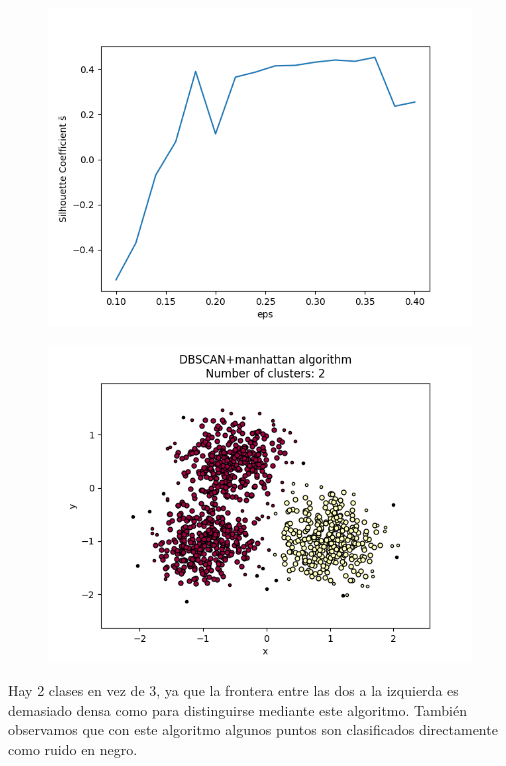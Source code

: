 \documentclass[a4paper]{article}
\begin{document}
	\begin{figure}[h!]\centering
\begin{minipage}{.4\textwidth}\label{fig:5}
	\includegraphics[width=\linewidth]{Figure_5}
	\end{minipage}\qquad
\begin{minipage}{.4\textwidth}\label{fig:6}
	\includegraphics[width=\linewidth]{Figure_6}
	\end{minipage}
	\end{figure}
	
	Hay 2 clases en vez de 3, ya que la frontera entre las dos a la izquierda es demasiado densa como para distinguirse mediante este algoritmo. También observamos que con este algoritmo algunos puntos son clasificados directamente como ruido en negro.
	
\end{document}
